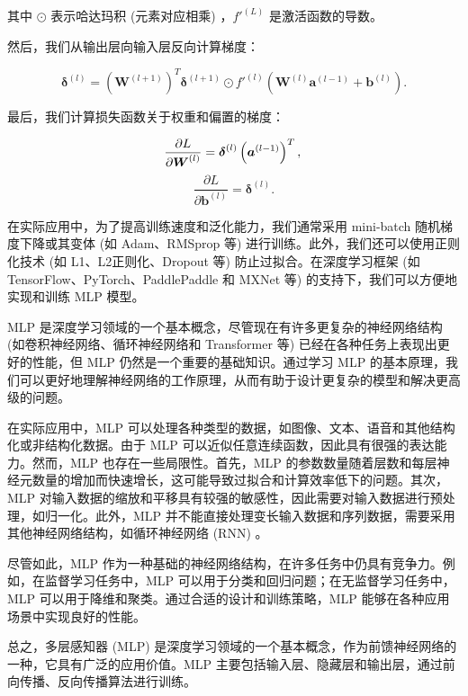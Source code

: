 其中 $\odot$ 表示哈达玛积 (元素对应相乘) ，$f'^{(L)}$ 是激活函数的导数。

然后，我们从输出层向输入层反向计算梯度：

\begin{equation}
\boldsymbol{\delta}^{(l)} = \left( \boldsymbol{W}^{(l+1)} \right)^T \boldsymbol{\delta}^{(l+1)} \odot f'^{(l)}(\boldsymbol{W}^{(l)}\boldsymbol{a}^{(l-1)} + \boldsymbol{b}^{(l)}).
\end{equation}

最后，我们计算损失函数关于权重和偏置的梯度：

\begin{equation}
\frac{\partial L}{\partial \boldsymbol{W}^{(l)}} = \boldsymbol{\delta}^{(l)} \left( \boldsymbol{a}^{(l-1)} \right)^T, \\
\end{equation}
\begin{equation}
\frac{\partial L}{\partial \boldsymbol{b}^{(l)}} = \boldsymbol{\delta}^{(l)}.
\end{equation}

在实际应用中，为了提高训练速度和泛化能力，我们通常采用 mini-batch 随机梯度下降或其变体 (如 Adam、RMSprop 等) 进行训练。此外，我们还可以使用正则化技术 (如 L1、L2正则化、Dropout 等) 防止过拟合。在深度学习框架 (如 TensorFlow、PyTorch、PaddlePaddle 和 MXNet 等) 的支持下，我们可以方便地实现和训练 MLP 模型\cite{lecun2015deep}。

MLP 是深度学习领域的一个基本概念，尽管现在有许多更复杂的神经网络结构 (如卷积神经网络、循环神经网络和 Transformer 等) 已经在各种任务上表现出更好的性能，但 MLP 仍然是一个重要的基础知识。通过学习 MLP 的基本原理，我们可以更好地理解神经网络的工作原理，从而有助于设计更复杂的模型和解决更高级的问题。

在实际应用中，MLP 可以处理各种类型的数据，如图像、文本、语音和其他结构化或非结构化数据。由于 MLP 可以近似任意连续函数，因此具有很强的表达能力。然而，MLP 也存在一些局限性。首先，MLP 的参数数量随着层数和每层神经元数量的增加而快速增长，这可能导致过拟合和计算效率低下的问题。其次，MLP 对输入数据的缩放和平移具有较强的敏感性，因此需要对输入数据进行预处理，如归一化。此外，MLP 并不能直接处理变长输入数据和序列数据，需要采用其他神经网络结构，如循环神经网络 (RNN) 。

尽管如此，MLP 作为一种基础的神经网络结构，在许多任务中仍具有竞争力。例如，在监督学习任务中，MLP 可以用于分类和回归问题；在无监督学习任务中，MLP 可以用于降维和聚类。通过合适的设计和训练策略，MLP 能够在各种应用场景中实现良好的性能。

总之，多层感知器 (MLP) 是深度学习领域的一个基本概念，作为前馈神经网络的一种，它具有广泛的应用价值。MLP 主要包括输入层、隐藏层和输出层，通过前向传播、反向传播算法进行训练。
